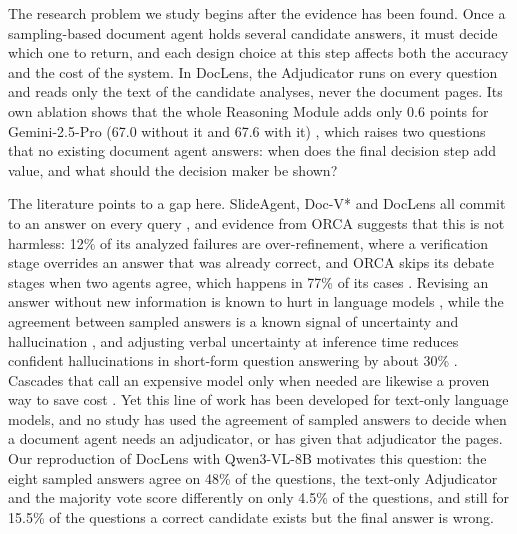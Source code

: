\documentclass[conference]{IEEEtran}
\begin{document}
The research problem we study begins after the evidence has been found. Once a sampling-based document agent holds several candidate answers, it must decide which one to return, and each design choice at this step affects both the accuracy and the cost of the system. In DocLens, the Adjudicator runs on every question and reads only the text of the candidate analyses, never the document pages. Its own ablation shows that the whole Reasoning Module adds only 0.6 points for Gemini-2.5-Pro (67.0 without it and 67.6 with it) \cite{zhu2025doclens}, which raises two questions that no existing document agent answers: when does the final decision step add value, and what should the decision maker be shown?

The literature points to a gap here. SlideAgent, Doc-V* and DocLens all commit to an answer on every query \cite{slideagent,docvstar,zhu2025doclens}, and evidence from ORCA suggests that this is not harmless: 12\% of its analyzed failures are over-refinement, where a verification stage overrides an answer that was already correct, and ORCA skips its debate stages when two agents agree, which happens in 77\% of its cases \cite{orca}. Revising an answer without new information is known to hurt in language models \cite{huang2024selfcorrect}, while the agreement between sampled answers is a known signal of uncertainty and hallucination \cite{kuhn2023semantic,manakul2023selfcheckgpt}, and adjusting verbal uncertainty at inference time reduces confident hallucinations in short-form question answering by about 30\% \cite{ji2025verbal}. Cascades that call an expensive model only when needed are likewise a proven way to save cost \cite{chen2024frugalgpt}. Yet this line of work has been developed for text-only language models, and no study has used the agreement of sampled answers to decide when a document agent needs an adjudicator, or has given that adjudicator the pages. Our reproduction of DocLens with Qwen3-VL-8B motivates this question: the eight sampled answers agree on 48\% of the questions, the text-only Adjudicator and the majority vote score differently on only 4.5\% of the questions, and still for 15.5\% of the questions a correct candidate exists but the final answer is wrong.
\end{document}
